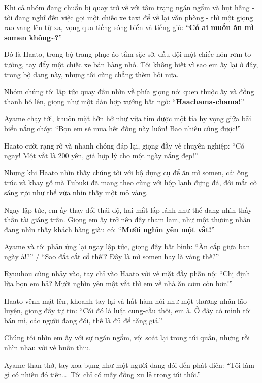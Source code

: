 \documentclass[../main.tex]{subfiles}
\begin{document}
Khi cả nhóm đang chuẩn bị quay trở về với tâm trạng ngán ngẩm và hụt hẫng - tôi đang nghĩ đến việc gọi một chiếc xe taxi để về lại văn phòng - thì một giọng rao vang lên từ xa, vọng qua tiếng sóng biển và tiếng gió: ``\textbf{Có ai muốn ăn mì somen không\~{}?}''

Đó là Haato, trong bộ trang phục áo tắm sặc sỡ, đầu đội một chiếc nón rơm to tướng, tay đẩy một chiếc xe bán hàng nhỏ. Tôi không biết vì sao em ấy lại ở đây, trong bộ dạng này, nhưng tôi cũng chẳng thèm hỏi nữa.


Nhóm chúng tôi lập tức quay đầu nhìn về phía giọng nói quen thuộc ấy và đồng thanh hô lên, giọng như một dàn hợp xướng bất ngờ: ``\textbf{Haachama-chama!}''

Ayame chạy tới, khuôn mặt hớn hở như vừa tìm được một tia hy vọng giữa bãi biển nắng cháy: ``Bọn em sẽ mua hết đống này luôn! Bao nhiêu cũng được!''

Haato cười rạng rỡ và nhanh chóng đáp lại, giọng đầy vẻ chuyên nghiệp: ``Có ngay! Một vắt là 200 yên, giá hợp lý cho một ngày nắng đẹp!''

Nhưng khi Haato nhìn thấy chúng tôi với bộ dụng cụ để ăn mì somen, cái ống trúc và khay gỗ mà Fubuki đã mang theo cùng với hộp lạnh đựng đá, đôi mắt cô sáng rực như thể vừa nhìn thấy một mỏ vàng.


Ngay lập tức, em ấy thay đổi thái độ, hai mắt lấp lánh như thể đang nhìn thấy thần tài giáng trần. Giọng em ấy trở nên đầy tham lam, như một thương nhân đang nhìn thấy khách hàng giàu có: ``\textbf{Mười nghìn yên một vắt!}''

Ayame và tôi phản ứng lại ngay lập tức, giọng đầy bất bình:  ``Ăn cắp giữa ban ngày à!?'' / ``Sao đắt cắt cổ thế!? Đây là mì somen hay là vàng thế?''

Ryuuhou cũng nhảy vào, tay chỉ vào Haato với vẻ mặt đầy phẫn nộ: ``Chị định lừa bọn em hả? Mười nghìn yên một vắt thì em về nhà ăn cơm còn hơn!''

Haato vênh mặt lên, khoanh tay lại và hất hàm nói như một thương nhân lão luyện, giọng đầy tự tin: ``Cái đó là luật cung-cầu thôi, em à. Ở đây có mình tôi bán mì, các người đang đói, thế là đủ để tăng giá.''

Chúng tôi nhìn em ấy với sự ngán ngẩm, vội soát lại trong túi quần, nhưng rồi nhìn nhau với vẻ buồn thiu.

Ayame than thở, tay xoa bụng như một người đang đói đến phát điên: ``Tôi làm gì có nhiêu đó tiền\dots\ Tôi chỉ có mấy đồng xu lẻ trong túi thôi.''
\end{document}
